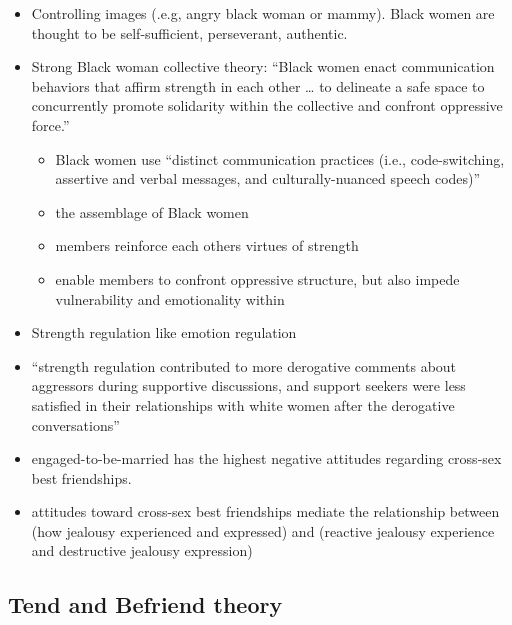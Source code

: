\documentclass[
]{book}
\providecommand{\tightlist}{%
  \setlength{\itemsep}{0pt}\setlength{\parskip}{0pt}}
\begin{document}
\citep{Davis_2019}

\begin{itemize}
\item
  Controlling images (.e.g, angry black woman or mammy). Black women are thought to be self-sufficient, perseverant,
  authentic.
\item
  Strong Black woman collective theory: ``Black women enact communication behaviors that affirm strength in each other
  \ldots{} to delineate a safe space to concurrently promote solidarity within the collective and confront oppressive
  force.''

  \begin{itemize}
  \item
    Black women use ``distinct communication practices (i.e., code-switching, assertive and verbal messages, and
    culturally-nuanced speech codes)''
  \item
    the assemblage of Black women
  \item
    members reinforce each others virtues of strength
  \item
    enable members to confront oppressive structure, but also impede vulnerability and emotionality within
  \end{itemize}
\item
  Strength regulation like emotion regulation
\item
  ``strength regulation contributed to more derogative comments about aggressors during supportive discussions, and
  support seekers were less satisfied in their relationships with white women after the derogative conversations''
\end{itemize}

\citep{Gilchrist_Petty_2019}

\begin{itemize}
\tightlist
\item
  engaged-to-be-married has the highest negative attitudes regarding cross-sex best friendships.
\item
  attitudes toward cross-sex best friendships mediate the relationship between (how jealousy experienced and
  expressed) and (reactive jealousy experience and destructive jealousy expression)
\end{itemize}

\hypertarget{tend-and-befriend-theory}{%
\subsection{Tend and Befriend theory}\label{tend-and-befriend-theory}}
\end{document}
